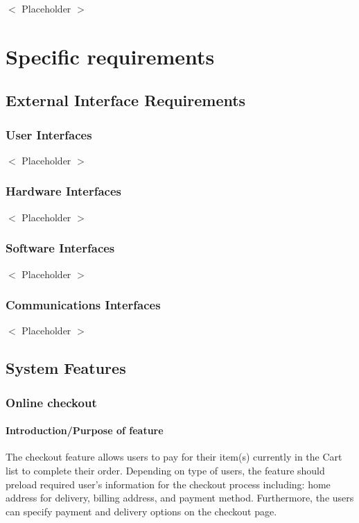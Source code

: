 \documentclass{scrreprt}
\begin{document}
$<$ Placeholder $>$




\chapter{Specific requirements}

\section{External Interface Requirements}

\subsection{User Interfaces}
$<$ Placeholder $>$

\subsection{Hardware Interfaces}
$<$ Placeholder $>$

\subsection{Software Interfaces}
$<$ Placeholder $>$

\subsection{Communications Interfaces}
$<$ Placeholder $>$

\section{System Features}


\subsection{Online checkout}
\subsubsection{Introduction/Purpose of feature}
The checkout feature allows users to pay for their item(s) currently in the Cart list to complete their order. Depending on type of users, the feature should preload required user’s information for the checkout process including: home address for delivery, billing address, and payment method. Furthermore, the users can specify payment and delivery options on the checkout page. 
\end{document}
